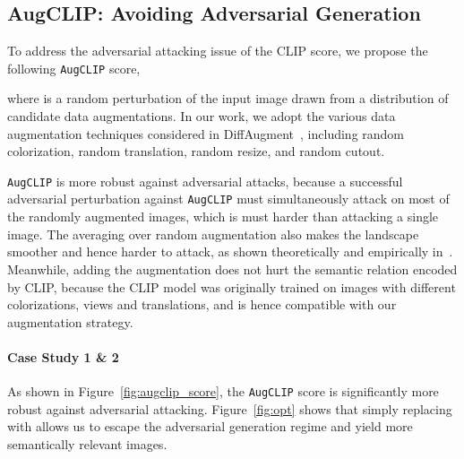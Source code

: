 \documentclass[10pt,twocolumn,letterpaper]{article}
\newcommand{\ourloss}{\texttt{AugCLIP}}
\begin{document}
\iffalse
which incorporates multiple random augmentation into the original CLIP score to relief the mismatch between image quality and optimization score. 
We further analyze a series of design choices in the optimization procedure to get better solutions, 
including an improved initialization strategy and an augmentation of the parameter space.
Finally, we expand the solution space beyond the original latent space of GAN by fusing two images.
To generate natural images upon the fusion operation, 
we propose a novel bi-level optimization problem, and solve it efficiently with a barrier function-based gradient descent algorithm.
\fi


\subsection{AugCLIP: Avoiding Adversarial Generation}
\label{subsec:augclip}
To address the adversarial attacking issue of the CLIP score, 
we propose the following {\ourloss} score, 

where  is a random perturbation 
of the input image  drawn from a distribution  of candidate data augmentations. In our work, we adopt the various data augmentation techniques considered in DiffAugment~\cite{zhao2020differentiable},  
including random colorization, random translation, random resize, and random cutout.

{\ourloss} is more robust against adversarial attacks, because a successful adversarial perturbation against {\ourloss} must simultaneously attack  on most of the randomly augmented images, which is must harder than attacking a single image. The averaging over random augmentation also makes the  landscape smoother and hence harder to attack, as shown theoretically and empirically in~\cite{cohen2019certified, salman2019provably}.
Meanwhile, adding the augmentation  
does not hurt the semantic relation encoded by CLIP, because the CLIP model was originally trained on images with different colorizations, views and translations, and is hence compatible with our augmentation strategy. 


\paragraph{Case Study 1 \& 2}
As shown in Figure~\ref{fig:augclip_score}, 
the {\ourloss} 
score is significantly more robust against adversarial attacking. 
Figure~\ref{fig:opt} shows that simply replacing  with  allows us to escape the adversarial generation regime and yield more semantically relevant images. 
\end{document}
